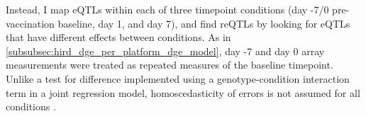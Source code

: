 %
%
%
%
%
%
%
%
%
%
Instead, I map \glspl{eQTL} within each of three timepoint conditions (day -7/0 pre-vaccination baseline, day 1, and day 7), and find \glspl{reQTL} by looking for \glspl{eQTL} that have different effects between conditions.
As in \cref{subsubsec:hird_dge_per_platform_dge_model}, day -7 and day 0 array measurements were treated as repeated measures of the baseline timepoint.
Unlike a test for difference implemented using a genotype-condition interaction term in a joint regression model, homoscedasticity of errors is not assumed for all conditions \autocite{clogg1995StatisticalMethodsComparing}.
